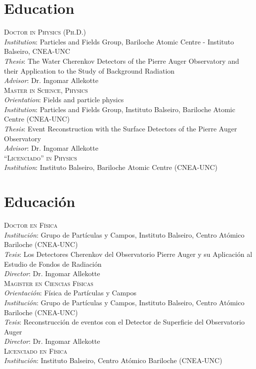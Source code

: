 \section*{Education}
\noindent
{}\textsc{Doctor in Physics (Ph.D.)}\\
{\emph{Institution}}: Particles and Fields Group, Bariloche Atomic Centre - Instituto Balseiro, CNEA-UNC\\
{\emph{Thesis}}: The Water Cherenkov Detectors of the Pierre Auger Observatory and their Application to the Study of Background Radiation\\
{\emph{Advisor}}: Dr. Ingomar Allekotte\\
\textsc{Master in Science, Physics}\\
{\emph{Orientation}}: Fields and particle physics\\
{\emph{Institution}}: Particles and Fields Group, Instituto Balseiro, Bariloche Atomic Centre (CNEA-UNC)\\
{\emph{Thesis}}: Event Reconstruction with the Surface Detectors of the Pierre
Auger Observatory\\
{\emph{Advisor}}: Dr. Ingomar Allekotte\\ 
\textsc{``Licenciado'' in Physics}\\
{\emph{Institution}}: Instituto Balseiro, Bariloche Atomic Centre (CNEA-UNC)\\
\else
\section*{Educación}
\noindent
{}\textsc{Doctor en Física}\\
{\emph{Institución}}: Grupo de Partículas y Campos, Instituto Balseiro, Centro Atómico Bariloche (CNEA-UNC)\\
{\emph{Tesis}}: Los Detectores Cherenkov del Observatorio Pierre Auger y su Aplicación al Estudio de Fondos de Radiación\\
{\emph{Director}}: Dr. Ingomar Allekotte\\
\textsc{Magister en Ciencias Físicas}\\
{\emph{Orientación}}: Física de Partículas y Campos\\
{\emph{Institución}}: Grupo de Partículas y Campos, Instituto Balseiro, Centro Atómico Bariloche (CNEA-UNC)\\
{\emph{Tesis}}: Reconstrucción de eventos con el Detector de Superficie del Observatorio Auger\\
{\emph{Director}}: Dr. Ingomar Allekotte\\ 
\textsc{Licenciado en Física}\\
{\emph{Institución}}: Instituto Balseiro, Centro Atómico Bariloche (CNEA-UNC)\\
\fi
